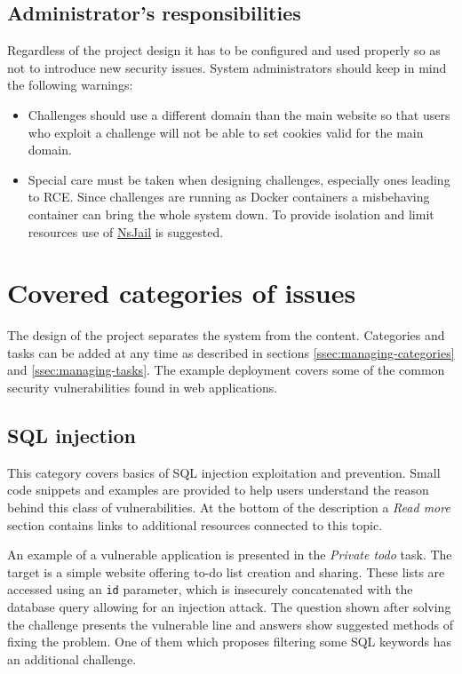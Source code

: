 \subsection{Administrator's responsibilities}

Regardless of the project design it has to be configured and used properly so as not to introduce new security issues. System administrators should keep in mind the following warnings:

\begin{itemize}
    \item Challenges should use a different domain than the main website so that users who exploit a challenge will not be able to set cookies valid for the main domain.
    \item Special care must be taken when designing challenges, especially ones leading to RCE. Since challenges are running as Docker containers a misbehaving container can bring the whole system down. To provide isolation and limit resources use of \href{https://github.com/google/nsjail}{NsJail} is suggested.
\end{itemize}

\section{Covered categories of issues}

The design of the project separates the system from the content. Categories and tasks can be added at any time as described in sections \ref{ssec:managing-categories} and \ref{ssec:managing-tasks}. The example deployment covers some of the common security vulnerabilities found in web applications.

\subsection{SQL injection}

This category covers basics of SQL injection exploitation and prevention. Small code snippets and examples are provided to help users understand the reason behind this class of vulnerabilities. At the bottom of the description a \textit{Read more} section contains links to additional resources connected to this topic.

An example of a vulnerable application is presented in the \textit{Private todo} task. The target is a simple website offering to-do list creation and sharing. These lists are accessed using an \texttt{id} parameter, which is insecurely concatenated with the database query allowing for an injection attack. The question shown after solving the challenge presents the vulnerable line and answers show suggested methods of fixing the problem. One of them which proposes filtering some SQL keywords has an additional challenge.

